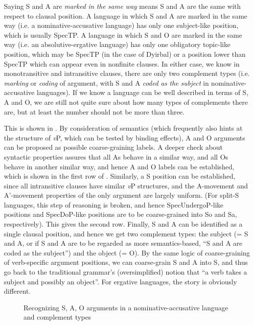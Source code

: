 \documentclass{article}
\newcommand*{\term}[1]{\emph{#1}}
\newcommand*{\vP}{\textit{v}P}
\begin{document}
Saying S and A are \term{marked in the same way} means S and A are the same with respect to clausal position.
A language in which S and A are marked in the same way (i.e. a nominative-accusative language)
has only one subject-like position, which is usually SpecTP.
A language in which S and O are marked in the same way (i.e. an absolutive-ergative language)
has only one obligatory topic-like position,
which may be SpecTP (in the case of Dyirbal) 
or a position lower than SpecTP which can appear even in nonfinite clauses.
In either case, we know in monotransitive and intransitive clauses,
there are only two complement types (i.e. \term{marking} or \term{coding} of argument,
with S and A \term{coded as the subject} in nominative-accusative languages).
If we know a language can be well described in terms of S, A and O,
we are still not quite sure about how many types of complements there are,
but at least the number should not be more than three.

This is shown in .
By consideration of semantics 
(which frequently also hints at the structure of \vP,
which can be tested by binding effects),
A and O arguments can be proposed as possible coarse-graining labels.
A deeper check about syntactic properties assures 
that all As behave in a similar way, 
and all Os behave in another similar way,
and hence A and O labels can be established, 
which is shown in the first row of .
Similarly, a S position can be established,
since all intransitive clauses have similar \vP{} structures, 
and the A-movement and A'-movement properties of the only argument are largely uniform.
(For split-S languages, this step of reasoning is broken,
and hence SpecUndergoP-like positions and SpecDoP-like positions 
are to be coarse-grained into So and Sa, respectively).
This gives the second row.
Finally, S and A can be identified as a single clausal position,
and hence we get two complement types: the subject 
(= S and A, or if S and A are to be regarded as more semantics-based, 
``S and A are coded as the subject'') 
and the object (= O).
By the same logic of coarse-graining of verb-specific argument positions,
we can coarse-grain S and A into S, 
and thus go back to the traditional grammar's (oversimplified) notion that 
``a verb takes a subject and possibly an object''.
For ergative languages, the story is obviously different.

\begin{figure}
    \centering
    
    \caption{Recognizing S, A, O arguments in a nominative-accusative language and complement types}
    \label{fig:sao-acc}
\end{figure}
\end{document}
